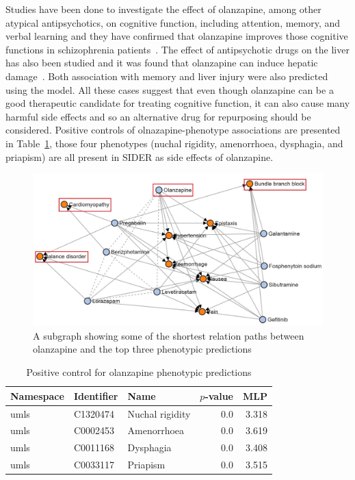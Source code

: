 Studies have been done to investigate the effect of olanzapine, among other atypical antipsychotics, on cognitive function, including attention, memory, and verbal learning and they have confirmed that olanzapine improves those cognitive functions in schizophrenia patients~\cite{mcgurk_cognitive_2004, smith_effects_2001, cuesta_effects_2001, purdon_neuropsychological_2000, bilder_neurocognitive_2002}.
The effect of antipsychotic drugs on the liver has also been studied and it was found that olanzapine can induce hepatic damage~\cite{lv_antipsychotic_2018}.
Both association with memory and liver injury were also predicted using the model. 
All these cases suggest that even though olanzapine can be a good therapeutic candidate for treating cognitive function, it can also cause many harmful side effects and so an alternative drug for repurposing should be considered.
Positive controls of olnazapine-phenotype associations are presented in Table~\ref{tab:ps_olanzapine}, those four phenotypes (nuchal rigidity, amenorrhoea, dysphagia, and priapism) are all present in \ac{SIDER} as side effects of olanzapine.

\begin{figure}[!ht]
    \centering
    \includegraphics[scale=0.6]
    {figures/olanzapine_phenotypes.jpg}
    \caption[Olanzapine's path subgraph for all phenotypes]{\label{fig:olanzapine_phenotypes} A subgraph showing some of the shortest relation paths between olanzapine and the top three phenotypic predictions}
\end{figure}

\begin{table}[!ht]
    \centering
    \begin{tabular}{|l|l|l|r|r|}
        \hline
        \textbf{Namespace} & \textbf{Identifier} & \textbf{Name} & \textbf{$p$-value} & \textbf{MLP} \\
        \hline
        umls & C1320474 & Nuchal rigidity & 0.0 & 3.318 \\
        \hline
        umls & C0002453 & Amenorrhoea & 0.0 & 3.619 \\
        \hline
        umls & C0011168 & Dysphagia & 0.0 & 3.408 \\
        \hline
        umls & C0033117 & Priapism & 0.0 & 3.515 \\
        \hline
    \end{tabular}
    \captionsetup{justification=centering}
    \caption{Positive control for olanzapine phenotypic predictions}
    \label{tab:ps_olanzapine}
\end{table}


